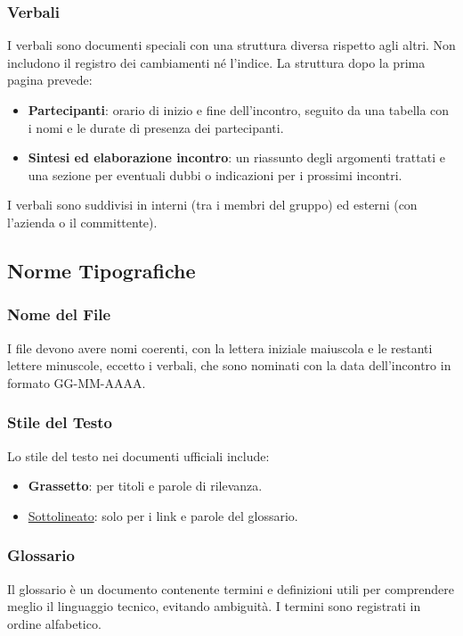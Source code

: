 \subsubsection{Verbali}
I verbali sono documenti speciali con una struttura diversa rispetto agli altri. Non includono il registro dei cambiamenti né l'indice.
La struttura dopo la prima pagina prevede:
\begin{itemize}
    \item \textbf{Partecipanti}: orario di inizio e fine dell'incontro, seguito da una tabella con i nomi e le durate di presenza dei partecipanti.
    \item \textbf{Sintesi ed elaborazione incontro}: un riassunto degli argomenti trattati e una sezione per eventuali dubbi o indicazioni per i prossimi incontri.
\end{itemize}
I verbali sono suddivisi in interni (tra i membri del gruppo) ed esterni (con l'azienda o il committente).

\subsection{Norme Tipografiche}

\subsubsection{Nome del File}
I file devono avere nomi coerenti, con la lettera iniziale maiuscola e le restanti lettere minuscole, 
eccetto i verbali, che sono nominati con la data dell'incontro in formato GG-MM-AAAA.

\subsubsection{Stile del Testo}
Lo stile del testo nei documenti ufficiali include:
\begin{itemize}
    \item \textbf{Grassetto}: per titoli e parole di rilevanza.
    \item \underline{Sottolineato}: solo per i link e parole del glossario.
\end{itemize}

\subsubsection{Glossario}
Il glossario è un documento contenente termini e definizioni utili per comprendere meglio il linguaggio tecnico, evitando ambiguità. 
I termini sono registrati in ordine alfabetico.

